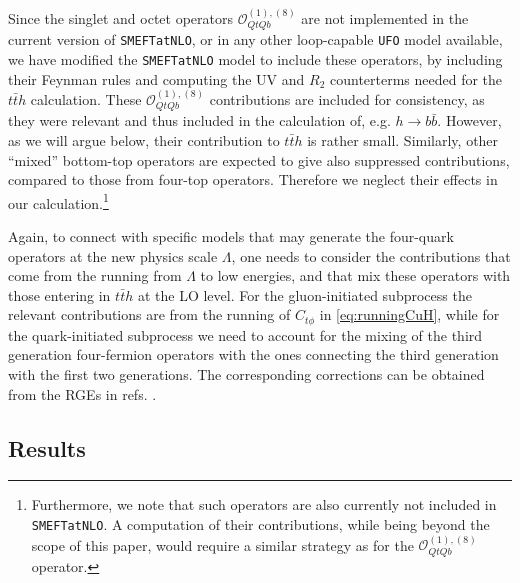 %
Since the singlet and octet operators $\mathcal{O}_{QtQb}^{(1),(8)}$ are not implemented in the current version of \texttt{SMEFTatNLO}, or in any other loop-capable \texttt{UFO} model available, we have modified the \texttt{SMEFTatNLO} model to include these operators, by including their Feynman rules and computing the UV and $R_2$ counterterms needed for the $t\bar t h$ calculation. 
These $\mathcal{O}_{QtQb}^{(1),(8)}$ contributions are included for consistency, as they were relevant and thus included in the calculation of, e.g. $h\to b\bar{b}$. However, as we will argue below, their contribution to $t\bar{t}h$ is rather small. Similarly, other ``mixed'' bottom-top operators are expected
to give also suppressed contributions, compared to those from four-top operators. Therefore we neglect their effects in our calculation.\footnote{Furthermore, we note that such operators are also currently not included in \texttt{SMEFTatNLO}. A computation of their contributions, while being beyond the scope of this paper, would require a similar strategy as for the $\mathcal{O}_{QtQb}^{(1),(8)}$ operator.}

Again, to connect with specific models that may generate the four-quark operators at the new physics scale $\Lambda$, one needs to consider the contributions that come from the running from $\Lambda$ to low energies, and that mix these operators with those entering in $t\bar{t}h$ at the LO level. 
For the gluon-initiated subprocess the relevant contributions are from the running of $C_{t\phi}$ in \eqref{eq:runningCuH}, while for the quark-initiated subprocess we need to account for the mixing of the third generation four-fermion operators with the ones connecting the third generation with the first two generations. The corresponding corrections can be obtained from the RGEs in refs. \cite{Jenkins:2013zja,Jenkins:2013wua,Alonso:2013hga}.


\subsection{Results}

